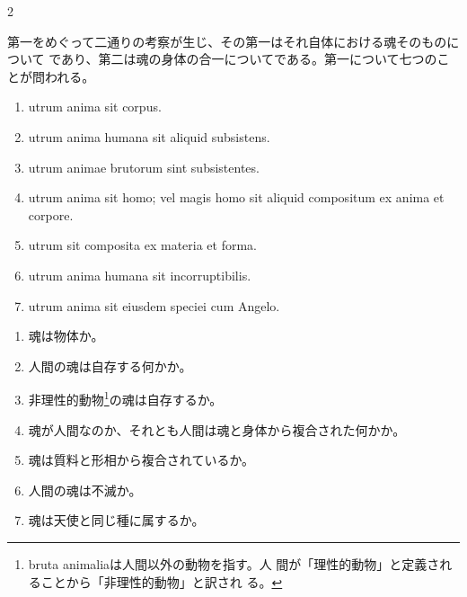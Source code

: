 \documentclass[paper=a4paper,fontsize=10pt,jafontsize=9pt,titlepage]{jlreq}
\begin{document}
\begin{paracol}{2}
\switchcolumn

 第一をめぐって二通りの考察が生じ、その第一はそれ自体における魂そのものについて
 であり、第二は魂の身体の合一についてである。第一について七つのことが問われる。

\switchcolumn

\begin{enumerate}
 \item utrum anima sit corpus.
 \item utrum anima humana sit aliquid subsistens.
 \item utrum animae brutorum sint subsistentes.
 \item utrum anima sit homo; vel magis homo sit aliquid compositum ex anima et corpore.
 \item utrum sit composita ex materia et forma.
 \item utrum anima humana sit incorruptibilis.
 \item utrum anima sit eiusdem speciei cum Angelo.
\end{enumerate}

\switchcolumn

\begin{enumerate}
 \item 魂は物体か。
 \item 人間の魂は自存する何かか。
 \item 非理性的動物\footnote{bruta animaliaは人間以外の動物を指す。人
       間が「理性的動物」と定義されることから「非理性的動物」と訳され
       る。}の魂は自存するか。
 \item 魂が人間なのか、それとも人間は魂と身体から複合された何かか。
 \item 魂は質料と形相から複合されているか。
 \item 人間の魂は不滅か。
 \item 魂は天使と同じ種に属するか。
\end{enumerate}

\end{paracol}

\newpage
{}
\end{document}

